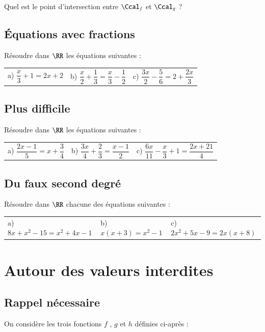 \documentclass[oneside,12pt]{article}          %
\begin{document}
Quel est le point d'intersection entre $\Ccal_f$ et $\Ccal_g$ ?



\subsection{Équations avec fractions}
Résoudre dans $\RR$ les équations suivantes :
	
\renewcommand{\arraystretch}{1.5}
\begin{tabular}{p{} p{} p{}}
	a) $\dfrac{x}{3} + 1 = 2x + 2$ &
	b) $\dfrac{x}{2} + \dfrac{1}{3} = \dfrac{x}{3} - \dfrac{1}{2}$ &
	c) $\dfrac{3x}{2} - \dfrac{5}{6} = 2 + \dfrac{2x}{3}$ 
\end{tabular}



\subsection{Plus difficile}
Résoudre dans $\RR$ les équations suivantes :
	
\renewcommand{\arraystretch}{1.5}
\begin{tabular}{p{} p{} p{}}
	a) $\dfrac{2x - 1}{5} = x + \dfrac{3}{4}$ &
	b) $\dfrac{3x}{4} + \dfrac{2}{3} = \dfrac{x - 1}{2}$ &
	c) $\dfrac{6x}{11} - \dfrac{x}{3} + 1 = \dfrac{2x + 21}{4}$
\end{tabular}



\subsection{Du faux second degré}
Résoudre dans $\RR$ chacune des équations suivantes :

\begin{tabular}{p{} p{} p{}}
	a) $8x + x^2 - 15 = x^2 + 4x - 1$ &
	b) $x(x + 3) = x^2 - 1$ &
	c) $2x^2 + 5x - 9 = 2x(x + 8)$
\end{tabular}



\section{Autour des valeurs interdites}

\subsection{Rappel nécessaire}
On considère les trois fonctions $f$ , $g$ et $h$ définies ci-après :
\end{document}
